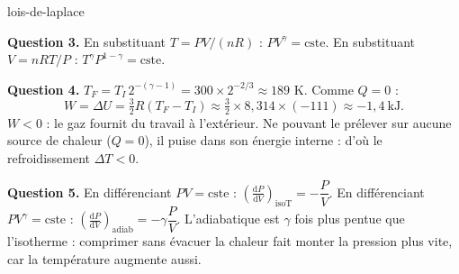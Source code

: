 \begin{exo}{lois-de-laplace}
\begin{solution}
\textbf{Question 3.} En substituant $T = PV/(nR)$ : $PV^\gamma = \text{cste}$. En substituant $V = nRT/P$ : $T^\gamma P^{1-\gamma} = \text{cste}$.

\textbf{Question 4.} $T_F = T_I\,2^{-(\gamma-1)} = 300 \times 2^{-2/3} \approx 189$ K. Comme $Q = 0$ :
\[
W = \Delta U = \tfrac{3}{2}R(T_F - T_I) \approx \tfrac{3}{2}\times 8{,}314 \times (-111) \approx -1{,}4\ \text{kJ}.
\]
$W < 0$ : le gaz fournit du travail à l'extérieur. Ne pouvant le prélever sur aucune source de chaleur ($Q=0$), il puise dans son énergie interne : d'où le refroidissement $\Delta T < 0$.

\textbf{Question 5.} En différenciant $PV = \text{cste}$ : $\left(\frac{\mathrm{d}P}{\mathrm{d}V}\right)_{\text{isoT}} = -\dfrac{P}{V}$. En différenciant $PV^\gamma = \text{cste}$ : $\left(\frac{\mathrm{d}P}{\mathrm{d}V}\right)_{\text{adiab}} = -\gamma\dfrac{P}{V}$. L'adiabatique est $\gamma$ fois plus pentue que l'isotherme : comprimer sans évacuer la chaleur fait monter la pression plus vite, car la température augmente aussi.
\end{solution}
\end{exo}

